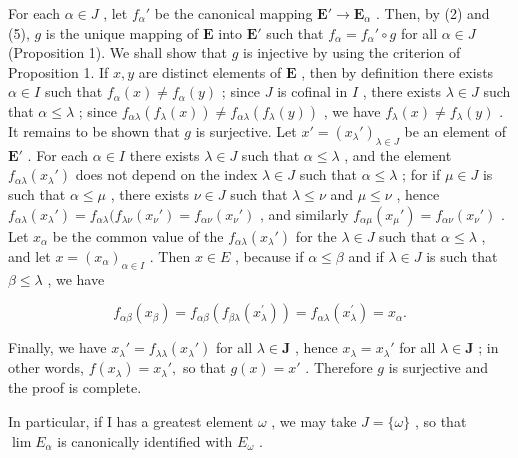 For each \(\alpha \in J\) , let \(f_{\alpha}'\) be the canonical mapping \(\mathbf{E}' \to \mathbf{E}_{\alpha}\) . Then, by (2) and (5), \(g\) is the unique mapping of \(\mathbf{E}\) into \(\mathbf{E}'\) such that \(f_{\alpha} = f_{\alpha}' \circ g\) for all \(\alpha \in J\) (Proposition 1). We shall show that \(g\) is injective by using the criterion of Proposition 1. If \(x, y\) are distinct elements of \(\mathbf{E}\) , then by definition there exists \(\alpha \in I\) such that \(f_{\alpha}(x) \neq f_{\alpha}(y)\) ; since \(J\) is cofinal in \(I\) , there exists \(\lambda \in J\) such that \(\alpha \leqslant \lambda\) ; since \(f_{\alpha\lambda}(f_{\lambda}(x)) \neq f_{\alpha\lambda}(f_{\lambda}(y))\) , we have \(f_{\lambda}(x) \neq f_{\lambda}(y)\) . It remains to be shown that \(g\) is surjective. Let \(x' = (x_{\lambda}')_{\lambda \in J}\) be an element of \(\mathbf{E}'\) . For each \(\alpha \in I\) there exists \(\lambda \in J\) such that \(\alpha \leqslant \lambda\) , and the element \(f_{\alpha\lambda}(x_{\lambda}')\) does not depend on the index \(\lambda \in J\) such that \(\alpha \leqslant \lambda\) ; for if \(\mu \in J\) is such that \(\alpha \leqslant \mu\) , there exists \(\nu \in J\) such that \(\lambda \leqslant \nu\) and \(\mu \leqslant \nu\) , hence \(f_{\alpha\lambda}(x_{\lambda}') = f_{\alpha\lambda}(f_{\lambda\nu}(x_{\nu}') = f_{\alpha\nu}(x_{\nu}')\) , and similarly \(f_{\alpha\mu}(x_{\mu}') = f_{\alpha\nu}(x_{\nu}')\) . Let \(x_{\alpha}\) be the common value of the \(f_{\alpha\lambda}(x_{\lambda}')\) for the \(\lambda \in J\) such that \(\alpha \leqslant \lambda\) , and let \(x = (x_{\alpha})_{\alpha \in I}\) . Then \(x \in E\) , because if \(\alpha \leqslant \beta\) and if \(\lambda \in J\) is such that \(\beta \leqslant \lambda\) , we have

\[
f _ {\alpha \beta} (x _ {\beta}) = f _ {\alpha \beta} (f _ {\beta \lambda} (x _ {\lambda} ^ {\prime})) = f _ {\alpha \lambda} (x _ {\lambda} ^ {\prime}) = x _ {\alpha}.
\]

Finally, we have \(x_{\lambda}' = f_{\lambda \lambda}(x_{\lambda}')\) for all \(\lambda \in \mathbf{J}\) , hence \(x_{\lambda} = x_{\lambda}'\) for all \(\lambda \in \mathbf{J}\) ; in other words, \(f(x_{\lambda}) = x_{\lambda}',\) so that \(g(x) = x'\) . Therefore \(g\) is surjective and the proof is complete.

In particular, if I has a greatest element \(\omega\) , we may take \(J = \{\omega\}\) , so that \(\lim E_{\alpha}\) is canonically identified with \(E_{\omega}\) .

